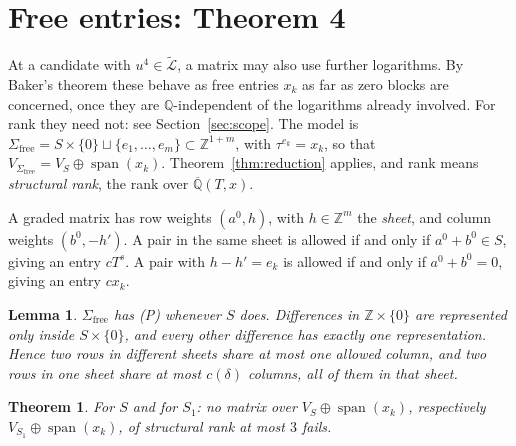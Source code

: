 \documentclass[11pt,a4paper]{article}
\theoremstyle{plain}
\newtheorem{theorem}{Theorem}
\newtheorem{lemma}{Lemma}[section]
\theoremstyle{definition}
\newcommand{\Q}{\mathbb{Q}}
\newcommand{\Z}{\mathbb{Z}}
\newcommand{\Qbar}{\overline{\mathbb{Q}}}
\newcommand{\Lt}{\widetilde{\mathcal{L}}}
\newcommand{\spn}{\operatorname{span}}
\newcommand{\free}{\mathrm{free}}
\begin{document}
\section{Free entries: Theorem 4}\label{sec:free}

At a candidate with $u^{4}\in\Lt$, a matrix may also use further logarithms. By Baker's theorem \cite{Bak66} these behave as free entries $x_{k}$ as far as zero blocks are concerned, once they are $\Q$-independent of the logarithms already involved. For rank they need not: see Section~\ref{sec:scope}. The model is $\Sigma_{\free}=S\times\{0\}\sqcup\{e_{1},\dots,e_{m}\}\subset\Z^{1+m}$, with $\tau^{e_{k}}=x_{k}$, so that $V_{\Sigma_{\free}}=V_{S}\oplus\spn(x_{k})$. Theorem~\ref{thm:reduction} applies, and rank means \emph{structural rank}, the rank over $\Qbar(T,x)$.

A graded matrix has row weights $(a^{0},h)$, with $h\in\Z^{m}$ the \emph{sheet}, and column weights $(b^{0},-h')$. A pair in the same sheet is allowed if and only if $a^{0}+b^{0}\in S$, giving an entry $cT^{s}$. A pair with $h-h'=e_{k}$ is allowed if and only if $a^{0}+b^{0}=0$, giving an entry $cx_{k}$.

\begin{lemma}\label{lem:free}
$\Sigma_{\free}$ has \textup{(P)} whenever $S$ does. Differences in $\Z\times\{0\}$ are represented only inside $S\times\{0\}$, and every other difference has exactly one representation. Hence two rows in different sheets share at most one allowed column, and two rows in one sheet share at most $c(\delta)$ columns, all of them in that sheet.
\end{lemma}

\begin{theorem}\label{thm:free}
For $S$ and for $S_{1}$: no matrix over $V_{S}\oplus\spn(x_{k})$, respectively $V_{S_{1}}\oplus\spn(x_{k})$, of structural rank at most $3$ fails.
\end{theorem}
\end{document}
